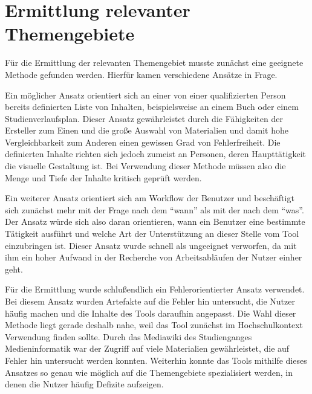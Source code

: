
\chapter{Ermittlung relevanter Themengebiete} %

\label{Ermittlung} %



Für die Ermittlung der relevanten Themengebiet musste zunächst eine geeignete Methode gefunden werden. Hierfür kamen verschiedene Ansätze in Frage.

Ein möglicher Ansatz orientiert sich an einer von einer qualifizierten Person bereits definierten Liste von Inhalten, beispielsweise an einem Buch oder einem Studienverlaufsplan.
Dieser Ansatz gewährleistet durch die Fähigkeiten der Ersteller zum Einen und die große Auswahl von Materialien und damit hohe Vergleichbarkeit zum Anderen einen gewissen Grad von Fehlerfreiheit.
Die definierten Inhalte richten sich jedoch zumeist an Personen, deren Haupttätigkeit die visuelle Gestaltung ist. Bei Verwendung dieser Methode müssen also die Menge und Tiefe der Inhalte kritisch geprüft werden.

Ein weiterer Ansatz orientiert sich am Workflow der Benutzer und beschäftigt sich zunächst mehr mit der Frage nach dem “wann” als mit der nach dem “was”. Der Ansatz würde sich also daran orientieren, wann ein Benutzer eine bestimmte Tätigkeit ausführt und welche Art der Unterstützung an dieser Stelle vom Tool einzubringen ist.
Dieser Ansatz wurde schnell als ungeeignet verworfen, da mit ihm ein hoher Aufwand in der Recherche von Arbeitsabläufen der Nutzer einher geht.

Für die Ermittlung wurde schlußendlich ein Fehlerorientierter Ansatz verwendet. Bei diesem Ansatz wurden Artefakte auf die Fehler hin untersucht, die Nutzer häufig machen und die Inhalte des Tools daraufhin angepasst.
Die Wahl dieser Methode liegt gerade deshalb nahe, weil das Tool zunächst im Hochschulkontext Verwendung finden sollte. Durch das Mediawiki des Studienganges Medieninformatik war der Zugriff auf viele Materialien gewährleistet, die auf Fehler hin untersucht werden konnten. Weiterhin konnte das Tools mithilfe dieses Ansatzes so genau wie möglich auf die Themengebiete spezialisiert werden, in denen die Nutzer häufig Defizite aufzeigen.

